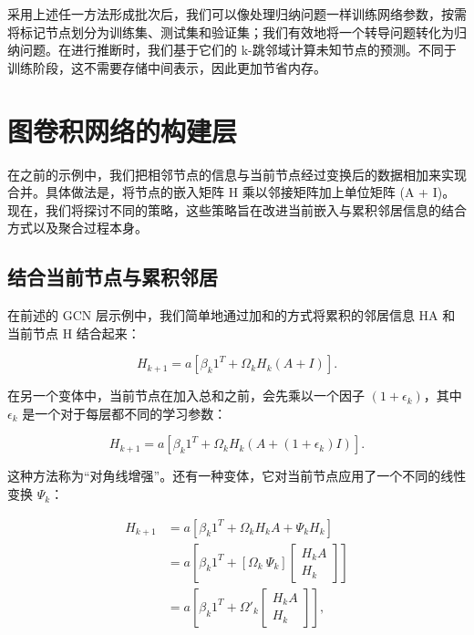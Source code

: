 采用上述任一方法形成批次后，我们可以像处理归纳问题一样训练网络参数，按需将标记节点划分为训练集、测试集和验证集；我们有效地将一个转导问题转化为归纳问题。在进行推断时，我们基于它们的 k-跳邻域计算未知节点的预测。不同于训练阶段，这不需要存储中间表示，因此更加节省内存。
\section{图卷积网络的构建层}
在之前的示例中，我们把相邻节点的信息与当前节点经过变换后的数据相加来实现合并。具体做法是，将节点的嵌入矩阵 H 乘以邻接矩阵加上单位矩阵 (A + I)。现在，我们将探讨不同的策略，这些策略旨在改进当前嵌入与累积邻居信息的结合方式以及聚合过程本身。

\subsection{结合当前节点与累积邻居}

在前述的 GCN 层示例中，我们简单地通过加和的方式将累积的邻居信息 HA 和当前节点 H 结合起来：

\begin{equation}
H_{k+1} = a \left[ \beta_k 1^T + \Omega_k H_k (A + I) \right]. 
\end{equation}

在另一个变体中，当前节点在加入总和之前，会先乘以一个因子 \((1 + \epsilon_k)\)，其中 \(\epsilon_k\) 是一个对于每层都不同的学习参数：

\begin{equation}
H_{k+1} = a \left[ \beta_{k} 1^T + \Omega_k H_k (A + (1 + \epsilon_k)I) \right]. 
\end{equation}

这种方法称为“对角线增强”。还有一种变体，它对当前节点应用了一个不同的线性变换 \(\Psi_k\)：


\begin{align}
H_{k+1} &= a \left[ \beta_{k} 1^T + \Omega_k H_k A + \Psi_k H_k \right] \\
&= a \left[ \beta_{k} 1^T + \left[ \Omega_k \ \Psi_k \right] \begin{bmatrix} H_k A \\ H_k \end{bmatrix} \right] \\
&= a \left[ \beta_{k} 1^T + \Omega'_k \begin{bmatrix} H_k A \\ H_k \end{bmatrix} \right], 
\end{align} 


